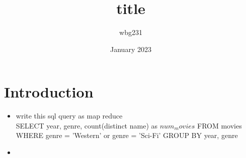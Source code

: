 \documentclass{article}
\title{title }
\author{wbg231 }
\date{January 2023}
\begin{document}
\maketitle

\section{Introduction}
\begin{itemize}
\subsection*{question 1 }
\item write this sql query as map reduce\\
 SELECT year, genre, count(distinct name) as $num_movies$
FROM movies
WHERE genre = 'Western' or genre = 'Sci-Fi'
GROUP BY year, genre
\item 
\end{itemize}
\end{document}
